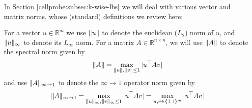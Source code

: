 In Section \ref{cellprobe:subsec:k-wise-lbs} we will deal with various vector and matrix norms, whose (standard) definitions we review here:
\begin{definition}
For a vector $u \in \mathbb{R}^m$ we use $\Vert u \Vert$ to denote the euclidean ($L_2$) norm of $u$, and $ \Vert u \Vert_\infty$ to denote its $L_{\infty}$ norm. For a matrix $A \in \mathbb{R}^{n \times n}$, we will use $\Vert A \Vert$ to denote the spectral norm given by
\[
\Vert A \Vert = \max\limits_{\Vert u \Vert,\Vert v \Vert \leq 1} |u^\top A v|
\]
and use $\Vert A \Vert_{\infty \to 1}$ to denote the $\infty\to1$ operator norm given by
\[
\Vert A \Vert_{\infty\to 1} = \max\limits_{\Vert u \Vert_\infty,\Vert v \Vert_\infty \leq 1}|u^\top A v| =  \max\limits_{u,v \in \{\pm 1\}^m} |u^\top A v|
\]
\end{definition}

